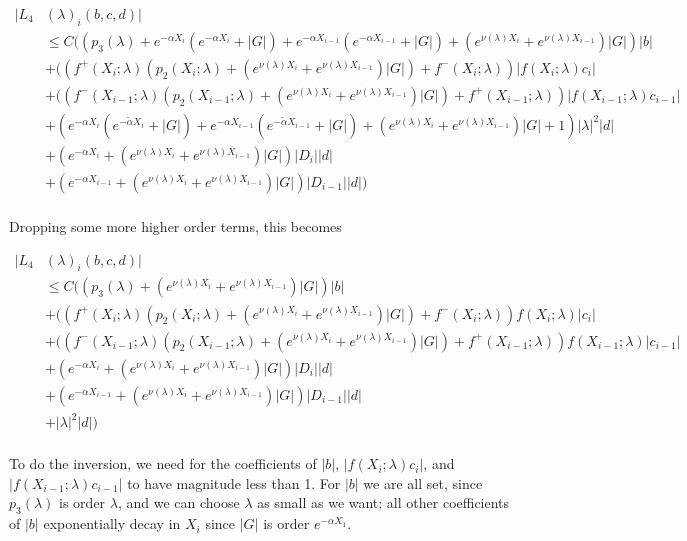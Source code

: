 \documentclass[12pt]{article}
\begin{document}
\begin{enumerate}
\begin{align*}
|L_4&(\lambda)_i(b, c, d)|\\ 
&\leq C\Big(( p_3(\lambda) + e^{-\alpha X_i}( e^{-\alpha X_i} + |G|) + e^{-\alpha X_{i-1}}( e^{-\alpha X_{i-1}} + |G|) + (e^{\nu(\lambda)X_i} + e^{\nu(\lambda)X_{i-1}}) |G| )|b| \\ 
&+ ((f^+(X_i; \lambda) (p_2(X_i; \lambda) + (e^{\nu(\lambda)X_i} + e^{\nu(\lambda)X_{i-1}})|G|) + f^-(X_i; \lambda) ) | f(X_i; \lambda) c_i| \\
&+ ((f^-(X_{i-1}; \lambda) (p_2(X_{i-1}; \lambda) + (e^{\nu(\lambda)X_i} + e^{\nu(\lambda)X_{i-1}})|G|) + f^+(X_{i-1}; \lambda) ) | f(X_{i-1}; \lambda) c_{i-1}| \\
&+ ( e^{-\alpha X_i}(e^{-\tilde{\alpha} X_i} + |G|) + e^{-\alpha X_{i-1}}(e^{-\tilde{\alpha} X_{i-1}} + |G|) + (e^{\nu(\lambda)X_i} + e^{\nu(\lambda)X_{i-1}}) |G| + 1) |\lambda|^2 |d| \\ 
&+ (e^{-\alpha X_i} + (e^{\nu(\lambda)X_i} + e^{\nu(\lambda)X_{i-1}}) |G| ) |D_i||d| \\
&+ (e^{-\alpha X_{i-1}} + (e^{\nu(\lambda)X_i} + e^{\nu(\lambda)X_{i-1}}) |G| ) |D_{i-1}||d|\Big)  \\
\end{align*}

Dropping some more higher order terms, this becomes

\begin{align*}
|L_4&(\lambda)_i(b, c, d)|\\ 
&\leq C\Big(( p_3(\lambda) + (e^{\nu(\lambda)X_i} + e^{\nu(\lambda)X_{i-1}}) |G| )|b| \\ 
&+ ((f^+(X_i; \lambda) (p_2(X_i; \lambda) + (e^{\nu(\lambda)X_i} + e^{\nu(\lambda)X_{i-1}})|G|) + f^-(X_i; \lambda) ) f(X_i; \lambda) |c_i| \\
&+ ((f^-(X_{i-1}; \lambda) (p_2(X_{i-1}; \lambda) + (e^{\nu(\lambda)X_i} + e^{\nu(\lambda)X_{i-1}})|G|) + f^+(X_{i-1}; \lambda) ) f(X_{i-1}; \lambda) |c_{i-1}| \\
&+ (e^{-\alpha X_i} + (e^{\nu(\lambda)X_i} + e^{\nu(\lambda)X_{i-1}}) |G| ) |D_i||d| \\
&+ (e^{-\alpha X_{i-1}} + (e^{\nu(\lambda)X_i} + e^{\nu(\lambda)X_{i-1}}) |G| ) |D_{i-1}||d| \\
&+ |\lambda|^2 |d| \Big) \\
\end{align*}

To do the inversion, we need for the coefficients of $|b|$, $|f(X_i; \lambda) c_i|$, and $|f(X_{i-1}; \lambda) c_{i-1}|$ to have magnitude less than 1. For $|b|$ we are all set, since $p_3(\lambda)$ is order $\lambda$, and we can choose $\lambda$ as small as we want; all other coefficients of $|b|$ exponentially decay in $X_i$ since $|G|$ is order $e^{-\alpha X_1}$. \\


\end{enumerate}
\end{document}
